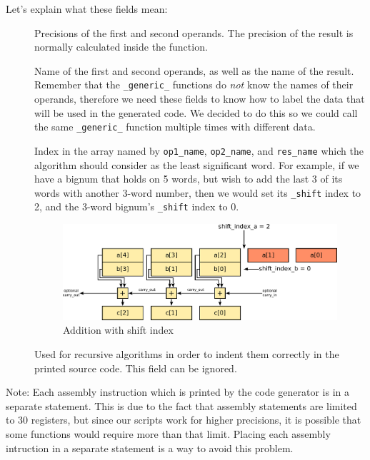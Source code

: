 \documentclass[12pt, a4paper]{report}
\begin{document}
Let's explain what these fields mean:
\begin{description}
\item[] Precisions of the first and second
operands. The precision of the result is normally calculated inside the
function.
\item[] Name of the first and second operands,
as well as the name of the result.
Remember that the \verb+_generic_+ functions do \emph{not} know the names of
their operands, therefore we need these fields to know how to label the data
that will be used in the generated code.
We decided to do this so we could call the same \verb+_generic_+ function
multiple times with different data.
\item[] Index in the array named by
\verb+op1_name+, \verb+op2_name+, and \verb+res_name+ which the
algorithm should consider as the least significant word.
For example, if we have a bignum that holds on 5 words, but wish to add the
last 3 of its words with another 3-word number, then we would set its
\verb+_shift+ index to 2, and the 3-word bignum's \verb+_shift+ index to 0.

\begin{figure}[h]
\centering
\includegraphics[width=\linewidth]{figs/addition_with_shift_index}
\caption{Addition with shift index}
\label{fig:addition_with_shift_index}
\end{figure}

\item[] Used for recursive algorithms in order to indent them
correctly in the printed source code.
This field can be ignored.
\end{description}

Note: Each assembly instruction which is printed by the code generator is in a
separate statement.
This is due to the fact that assembly statements are limited to 30 registers,
but since our scripts work for higher precisions, it is possible that some
functions would require more than that limit.
Placing each assembly intruction in a separate statement is a way to avoid this
problem.
\end{document}
